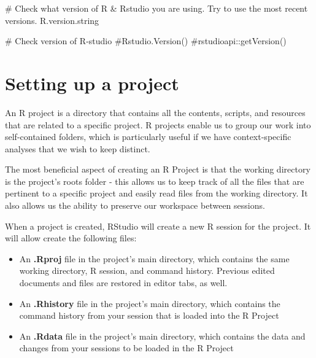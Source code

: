 \documentclass[
  letterpaper,
  DIV=11,
  numbers=noendperiod]{scrreprt}
\newenvironment{Shaded}{\begin{snugshade}}{\end{snugshade}}
\newcommand{\CommentTok}[1]{\textcolor[rgb]{0.37,0.37,0.37}{#1}}
\newcommand{\NormalTok}[1]{\textcolor[rgb]{0.00,0.23,0.31}{#1}}
\providecommand{\tightlist}{%
  \setlength{\itemsep}{0pt}\setlength{\parskip}{0pt}}\usepackage{longtable,booktabs,array}
\begin{document}
\begin{Shaded}
\begin{Highlighting}[]
\CommentTok{\# Check what version of R \& Rstudio you are using. Try to use the most recent versions.}
\NormalTok{R.version.string}
\end{Highlighting}
\end{Shaded}

\begin{Shaded}
\begin{Highlighting}[]
\CommentTok{\#   Check version of R{-}studio}
\CommentTok{\#Rstudio.Version()}
\CommentTok{\#rstudioapi::getVersion()}
\end{Highlighting}
\end{Shaded}

\hypertarget{setting-up-a-project}{%
\chapter{Setting up a project}\label{setting-up-a-project}}

An R project is a directory that contains all the contents, scripts, and
resources that are related to a specific project. R projects enable us
to group our work into self-contained folders, which is particularly
useful if we have context-specific analyses that we wish to keep
distinct.

The most beneficial aspect of creating an R Project is that the working
directory is the project's roots folder - this allows us to keep track
of all the files that are pertinent to a specific project and easily
read files from the working directory. It also allows us the ability to
preserve our workspace between sessions.

When a project is created, RStudio will create a new R session for the
project. It will allow create the following files:

\begin{itemize}
\tightlist
\item
  An \textbf{.Rproj} file in the project's main directory, which
  contains the same working directory, R session, and command history.
  Previous edited documents and files are restored in editor tabs, as
  well.
\item
  An \textbf{.Rhistory} file in the project's main directory, which
  contains the command history from your session that is loaded into the
  R Project
\item
  An \textbf{.Rdata} file in the project's main directory, which
  contains the data and changes from your sessions to be loaded in the R
  Project
\end{itemize}
\end{document}
